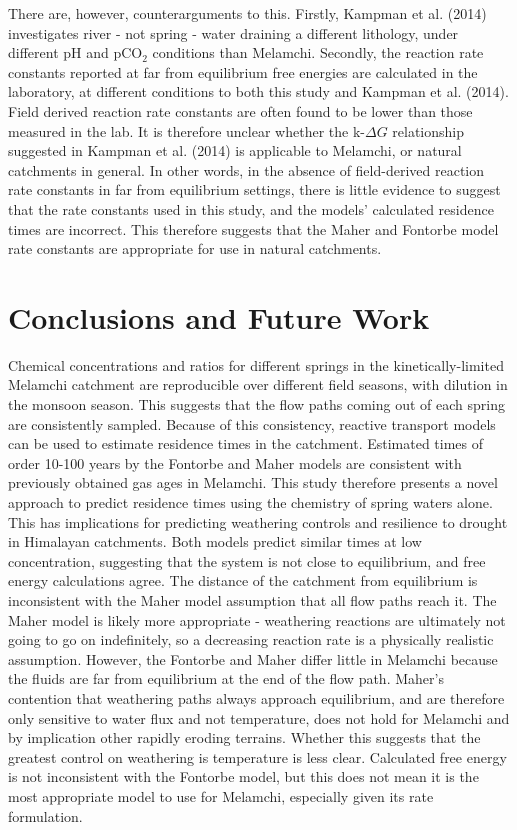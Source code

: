 There are, however, counterarguments to this. Firstly, Kampman et al. (2014) investigates river - not spring - water draining a different lithology, under different pH and pCO$_2$ conditions than Melamchi. Secondly, the reaction rate constants reported at far from equilibrium free energies are calculated in the laboratory, at different conditions to both this study and Kampman et al. (2014). Field derived reaction rate constants are often found to be lower than those measured in the lab. It is therefore unclear whether the k-$\Delta G$ relationship suggested in Kampman et al. (2014) is applicable to Melamchi, or natural catchments in general. In other words, in the absence of field-derived reaction rate constants in far from equilibrium settings, there is little evidence to suggest that the rate constants used in this study, and the models' calculated residence times are incorrect. This therefore suggests that the Maher and Fontorbe model rate constants are appropriate for use in natural catchments.


\newpage

\section{Conclusions and Future Work}

Chemical concentrations and ratios for different springs in the kinetically-limited Melamchi catchment are reproducible over different field seasons, with dilution in the monsoon season. This suggests that the flow paths coming out of each spring are consistently sampled. Because of this consistency, reactive transport models can be used to estimate residence times in the catchment. Estimated times of order 10-100 years by the Fontorbe and Maher models are consistent with previously obtained gas ages in Melamchi. This study therefore presents a novel approach to predict residence times using the chemistry of spring waters alone. This has implications for predicting weathering controls and resilience to drought in Himalayan catchments. Both models predict similar times at low concentration, suggesting that the system is not close to equilibrium, and free energy calculations agree. The distance of the catchment from equilibrium is inconsistent with the Maher model assumption that all flow paths reach it. The Maher model is likely more appropriate - weathering reactions are ultimately not going to go on indefinitely, so a decreasing reaction rate is a physically realistic assumption. However, the Fontorbe and Maher differ little in Melamchi because the fluids are far from equilibrium at the end of the flow path. Maher's contention that weathering paths always approach equilibrium, and are therefore only sensitive to water flux and not temperature, does not hold for Melamchi and by implication other rapidly eroding terrains. Whether this suggests that the greatest control on weathering is temperature is less clear. Calculated free energy is not inconsistent with the Fontorbe model, but this does not mean it is the most appropriate model to use for Melamchi, especially given its rate formulation.


